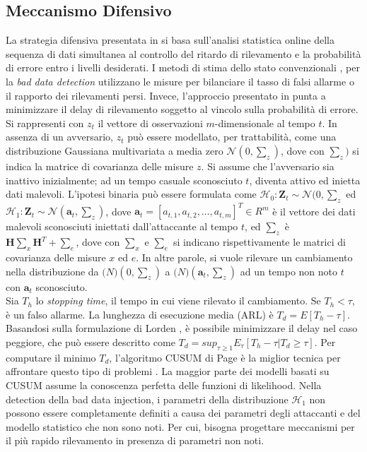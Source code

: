 \subsection{Meccanismo Difensivo}
La strategia difensiva presentata in \cite{baddatainjattackdef} si basa sull'analisi statistica online della sequenza di dati simultanea al controllo del ritardo di rilevamento e la probabilità di errore entro i livelli desiderati. I metodi di stima dello stato convenzionali \cite{convdef1}, \cite{convdef2} per la \emph{bad data detection} utilizzano le misure per bilanciare il tasso di falsi allarme o il rapporto dei rilevamenti persi. Invece, l'approccio presentato in \cite{baddatainjattackdef} punta a minimizzare il delay di rilevamento soggetto al vincolo sulla probabilità di errore.\\
Si rappresenti con $z_t$ il vettore di osservazioni $m$-dimensionale al tempo $t$. In assenza di un avversario, $z_t$ può essere modellato, per trattabilità, come una distribuzione Gaussiana multivariata a media zero $\mathcal{N}(0, \sum_z)$, dove con $\sum_z)$ si indica la matrice di covarianza delle misure $z$. Si assume che l'avversario sia inattivo inizialmente; ad un tempo casuale sconosciuto $t$, diventa attivo ed inietta dati malevoli. L'ipotesi binaria può essere formulata come $\mathcal{H}_0: \textbf{Z}_t \sim \mathcal{N}(0, \sum_z$ ed $\mathcal{H}_1: \textbf{Z}_t \sim \mathcal{N}(\textbf{a}_t, \sum_z)$, dove $\textbf{a}_t = [a_{t,1}, a_{t,2}, \ldots, a_{t,m}]^T \in R^m$ è il vettore dei dati malevoli sconosciuti iniettati dall'attaccante al tempo $t$, ed $\sum_z$ è $\textbf{H}\sum_x\textbf{H}^T + \sum_e$, dove con $\sum_x$ e $\sum_e$ si indicano rispettivamente le matrici di covarianza delle misure $x$ ed $e$. In altre parole, si vuole rilevare un cambiamento nella distribuzione da $\mathcal(N)(0, \sum_z)$ a $\mathcal(N)(\textbf{a}_t, \sum_z)$ ad un tempo non noto $t$ con $\textbf{a}_t$ sconosciuto.\\
Sia $T_h$ lo \emph{stopping time}, il tempo in cui viene rilevato il cambiamento. Se $T_h < \tau$, è un falso allarme. La lunghezza di esecuzione media (ARL) è $T_d = E[T_h - \tau]$. Basandosi sulla formulazione di Lorden \cite{lorden}, è possibile minimizzare il delay nel caso peggiore, che può essere descritto come $T_d = sup_{\tau \geq 1} E_{\tau}[T_h - \tau | T_d \geq \tau]$. Per computare il minimo $T_d$, l'algoritmo CUSUM di Page è la miglior tecnica per affrontare questo tipo di problemi \cite{lorden}. La maggior parte dei modelli basati su CUSUM assume la conoscenza perfetta delle funzioni di likelihood. Nella detection della bad data injection, i parametri della distribuzione $\mathcal{H}_1$ non possono essere completamente definiti a causa dei parametri degli attaccanti e del modello statistico che non sono noti. Per cui, bisogna progettare meccanismi per il più rapido rilevamento in presenza di parametri non noti.\\
